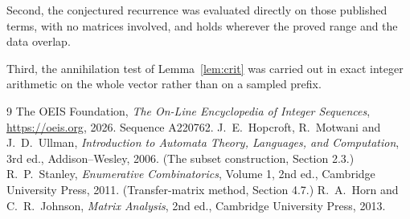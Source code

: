 \documentclass[11pt,a4paper]{article}
\theoremstyle{plain}
\theoremstyle{definition}
\begin{document}
Second, the conjectured recurrence was evaluated directly on those published terms, with no
matrices involved, and holds wherever the proved range and the data overlap.

Third, the annihilation test of Lemma~\ref{lem:crit} was carried out in exact integer
arithmetic on the whole vector rather than on a sampled prefix.

\begin{thebibliography}{9}
 The OEIS Foundation, \emph{The On-Line Encyclopedia of Integer
Sequences}, \url{https://oeis.org}, 2026. Sequence A220762.
 J.~E.~Hopcroft, R.~Motwani and J.~D.~Ullman, \emph{Introduction to Automata
Theory, Languages, and Computation}, 3rd ed., Addison--Wesley, 2006. (The subset
construction, Section 2.3.)
 R.~P.~Stanley, \emph{Enumerative Combinatorics}, Volume 1, 2nd ed.,
Cambridge University Press, 2011. (Transfer-matrix method, Section 4.7.)
 R.~A.~Horn and C.~R.~Johnson, \emph{Matrix Analysis}, 2nd ed., Cambridge
University Press, 2013.
\end{thebibliography}
\end{document}

